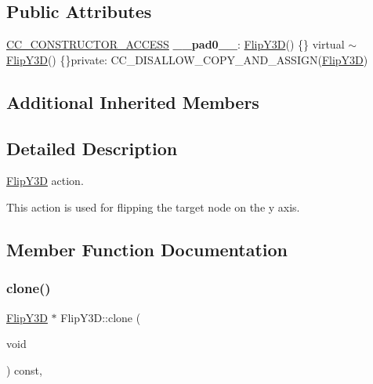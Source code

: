 \subsection*{Public Attributes}
\begin{DoxyCompactItemize}
\item 
\mbox{\label{classFlipY3D_ae0b5d590002ce501c54b83388c5d8a96}} 
\hyperlink{_2cocos2d_2cocos_2base_2ccConfig_8h_a25ef1314f97c35a2ed3d029b0ead6da0}{C\+C\+\_\+\+C\+O\+N\+S\+T\+R\+U\+C\+T\+O\+R\+\_\+\+A\+C\+C\+E\+SS} {\bfseries \+\_\+\+\_\+pad0\+\_\+\+\_\+}\+: \hyperlink{classFlipY3D}{Flip\+Y3D}() \{\} virtual $\sim$\hyperlink{classFlipY3D}{Flip\+Y3D}() \{\}private\+: C\+C\+\_\+\+D\+I\+S\+A\+L\+L\+O\+W\+\_\+\+C\+O\+P\+Y\+\_\+\+A\+N\+D\+\_\+\+A\+S\+S\+I\+GN(\hyperlink{classFlipY3D}{Flip\+Y3D})
\end{DoxyCompactItemize}
\subsection*{Additional Inherited Members}


\subsection{Detailed Description}
\hyperlink{classFlipY3D}{Flip\+Y3D} action. 

This action is used for flipping the target node on the y axis. 

\subsection{Member Function Documentation}
\mbox{\label{classFlipY3D_a797e0c0669bd83473d66dc8d77d49daa}} 
\subsubsection{\texorpdfstring{clone()}{clone()}\hspace{0.1cm}{\footnotesize\ttfamily [1/2]}}
{\footnotesize\ttfamily \hyperlink{classFlipY3D}{Flip\+Y3D} $\ast$ Flip\+Y3\+D\+::clone (\begin{DoxyParamCaption}\item[{void}]{ }\end{DoxyParamCaption}) const\hspace{0.3cm}{\ttfamily [override]}, {\ttfamily [virtual]}}

